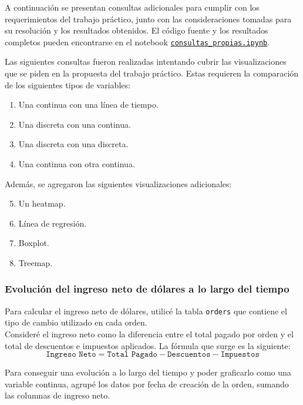 A continuación se presentan consultas adicionales para cumplir con los requerimientos del trabajo práctico, junto con las consideraciones tomadas para su resolución y los resultados obtenidos. El código fuente y los resultados completos pueden encontrarse en el notebook \href{https://github.com/patricioibar/datos-tp1/blob/main/consultas_propias.ipynb}{\texttt{consultas\_propias.ipynb}}.

Las siguientes consultas fueron realizadas intentando cubrir las visualizaciones que se piden en la propuesta del trabajo práctico. Estas requieren la comparación de los siguientes tipos de variables:
\begin{enumerate}
    \item Una continua con una línea de tiempo.
    \item Una discreta con una continua.
    \item Una discreta con una discreta.
    \item Una continua con otra continua.
\vspace{-1em}
\end{enumerate}
Además, se agregaron las siguientes visualizaciones adicionales:
\vspace{-1em}
\begin{enumerate}
    \setcounter{enumi}{4}
    \item Un heatmap.
    \item Línea de regresión.
    \item Boxplot.
    \item Treemap.
\end{enumerate}

\subsubsection{Evolución del ingreso neto de dólares a lo largo del tiempo}

Para calcular el ingreso neto de dólares, utilicé la tabla \texttt{orders} que contiene el tipo de cambio utilizado en cada orden.\\
Consideré el ingreso neto como la diferencia entre el total pagado por orden y el total de descuentos e impuestos aplicados. La fórmula que surge es la siguiente:
\[\texttt{Ingreso Neto} = \texttt{Total Pagado} - \texttt{Descuentos} - \texttt{Impuestos}\]

Para conseguir una evolución a lo largo del tiempo y poder graficarlo como una variable continua, agrupé los datos por fecha de creación de la orden, sumando las columnas de ingreso neto.

